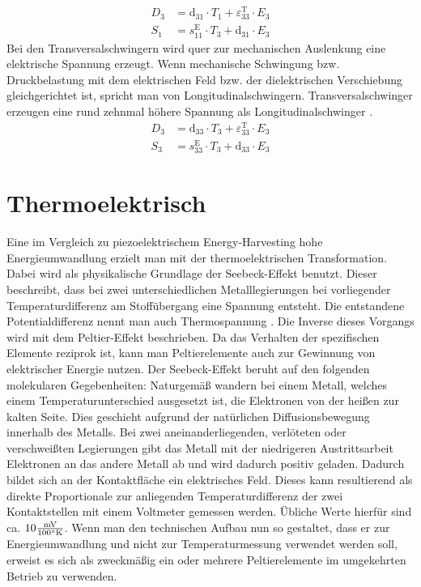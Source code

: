 \documentclass[11pt]{scrreprt} %
\begin{document}
\begin{align}
D_3 & =  \textrm{d}_{31} \cdot T_1 + \varepsilon_{33}^{\textrm{T}} \cdot E_3 \label{formel:3.3} \\
S_1 & =  s_{11}^{\textrm{E}} \cdot T_3 + \textrm{d}_{31} \cdot E_3 \label{formel:3.4}
\end{align}
Bei den Transversalschwingern wird quer zur mechanischen Auslenkung eine elektrische Spannung erzeugt. Wenn mechanische Schwingung bzw. Druckbelastung mit dem elektrischen Feld bzw. der dielektrischen Verschiebung gleichgerichtet ist, spricht man von Longitudinalschwingern. Transversalschwinger erzeugen eine rund zehnmal höhere Spannung als Longitudinalschwinger \citep[vgl. S.39]{Dembowski2011}.
\begin{align}
D_3 & =  \textrm{d}_{33} \cdot T_3 + \varepsilon_{33}^{\textrm{T}} \cdot E_3 \label{formel:3.5} \\
S_3 & =  s_{33}^{\textrm{E}} \cdot T_3 + \textrm{d}_{33} \cdot E_3 \label{formel:3.6}
\end{align}
\chapter{Thermoelektrisch}
Eine im Vergleich zu piezoelektrischem Energy-Harvesting hohe Energieumwandlung erzielt man mit der thermoelektrischen Transformation. Dabei wird als physikalische Grundlage der Seebeck-Effekt benutzt. Dieser beschreibt, dass bei zwei unterschiedlichen Metalllegierungen bei vorliegender Temperaturdifferenz am Stoffübergang eine Spannung entsteht. Die entstandene Potentialdifferenz nennt man auch Thermospannung \citep[vgl. S.158]{Schruefer2012}. Die Inverse dieses Vorgangs wird mit dem Peltier-Effekt beschrieben. Da das Verhalten der spezifischen Elemente reziprok ist, kann man Peltierelemente auch zur Gewinnung von elektrischer Energie nutzen. \newline
Der Seebeck-Effekt beruht auf den folgenden molekularen Gegebenheiten: Naturgemäß wandern bei einem Metall, welches einem Temperaturunterschied ausgesetzt ist, die Elektronen von der heißen zur kalten Seite. Dies geschieht aufgrund der natürlichen Diffusionsbewegung innerhalb des Metalls. Bei zwei aneinanderliegenden, verlöteten oder verschweißten Legierungen gibt das Metall mit der niedrigeren Austrittsarbeit Elektronen an das andere Metall ab und wird dadurch positiv geladen. Dadurch bildet sich an der Kontaktfläche ein elektrisches Feld. Dieses kann resultierend als direkte Proportionale zur anliegenden Temperaturdifferenz der zwei Kontaktstellen mit einem Voltmeter gemessen werden. Übliche Werte hierfür sind ca. $10  \frac{\textrm{mV}}{100 \degree \textrm{K}}$.\newline \newline
Wenn man den technischen Aufbau nun so gestaltet, dass er zur Energieumwandlung und nicht zur Temperaturmessung verwendet werden soll, erweist es sich als zweckmäßig ein oder mehrere Peltierelemente im umgekehrten Betrieb zu verwenden. \citep[vgl. S.30]{Dembowski2011}
\end{document}
